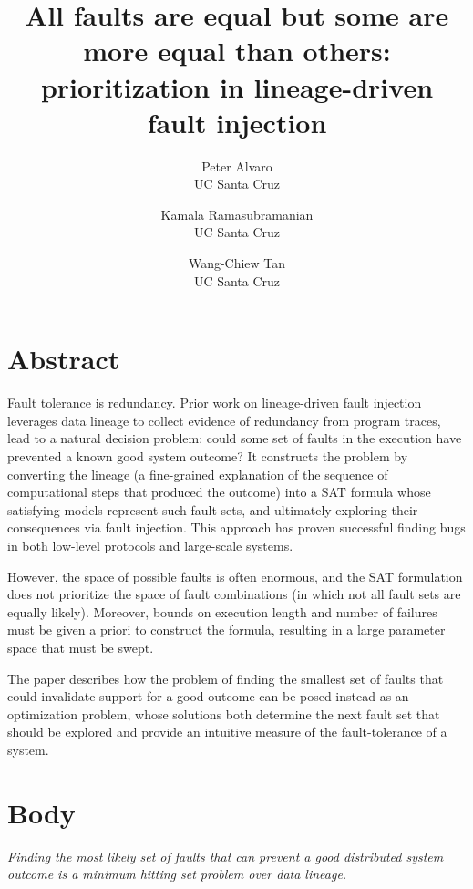 \documentclass{tinytocs}
\title{All faults are equal but some are more equal than others: prioritization in lineage-driven fault injection}
\author{Peter Alvaro\\
UC Santa Cruz\\
\and
Kamala Ramasubramanian\\
UC Santa Cruz\\
\and
Wang-Chiew Tan\\
UC Santa Cruz\\
}
\date{}
\begin{document}
\maketitle

\section{Abstract}

Fault tolerance is redundancy.  Prior work on lineage-driven fault injection leverages data lineage to collect 
evidence of redundancy from program traces,
lead to a natural decision problem: could some set of faults in the execution have prevented a known good system outcome?   
It constructs the problem by converting the lineage (a fine-grained explanation of the sequence of computational steps 
that produced the outcome) into a SAT formula whose satisfying models represent such fault sets, and ultimately exploring
their consequences via fault injection.  
This approach has proven successful finding bugs in both low-level protocols and large-scale systems\cite{molly}.

However, the space of possible faults is often enormous, and the SAT formulation does not prioritize the space of fault combinations (in which not all fault sets are equally likely). Moreover, bounds on execution length and number of failures must be given a priori to construct the formula, resulting in a large parameter space that must be swept.

The paper describes how the problem of finding the smallest set of faults that could invalidate support for a good outcome can be posed instead as an optimization problem, whose solutions both determine the next fault set that should be explored and provide an intuitive measure of the fault-tolerance of a system.

\section{Body}

\emph{Finding the most likely set of faults that can prevent a good distributed system outcome is a minimum hitting set problem over data lineage.}


\printbibliography
\end{document}
